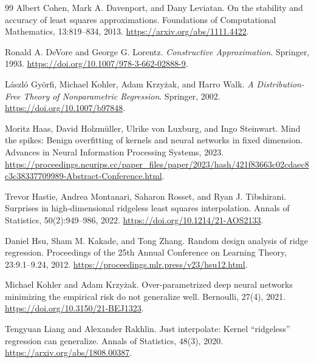 \documentclass[11pt,twoside]{article}
\theoremstyle{definition}
\theoremstyle{remark}
\begin{document}
\begin{thebibliography}{99}
Albert Cohen, Mark A. Davenport, and Dany Leviatan.
\newblock On the stability and accuracy of least squares approximations.
\newblock Foundations of Computational Mathematics, 13:819--834, 2013.
\newblock \url{https://arxiv.org/abs/1111.4422}.

Ronald A. DeVore and George G. Lorentz.
\newblock \emph{Constructive Approximation}.
\newblock Springer, 1993.
\newblock \url{https://doi.org/10.1007/978-3-662-02888-9}.

L\'aszl\'o Gy\"orfi, Michael Kohler, Adam Krzy\.zak, and Harro Walk.
\newblock \emph{A Distribution-Free Theory of Nonparametric Regression}.
\newblock Springer, 2002.
\newblock \url{https://doi.org/10.1007/b97848}.

Moritz Haas, David Holzm\"uller, Ulrike von Luxburg, and Ingo Steinwart.
\newblock Mind the spikes: Benign overfitting of kernels and neural networks
in fixed dimension.
\newblock Advances in Neural Information Processing Systems, 2023.
\newblock \url{https://proceedings.neurips.cc/paper_files/paper/2023/hash/421f83663c02cdaec8c3c38337709989-Abstract-Conference.html}.

Trevor Hastie, Andrea Montanari, Saharon Rosset, and Ryan J. Tibshirani.
\newblock Surprises in high-dimensional ridgeless least squares interpolation.
\newblock Annals of Statistics, 50(2):949--986, 2022.
\newblock \url{https://doi.org/10.1214/21-AOS2133}.

Daniel Hsu, Sham M. Kakade, and Tong Zhang.
\newblock Random design analysis of ridge regression.
\newblock Proceedings of the 25th Annual Conference on Learning Theory,
23:9.1--9.24, 2012.
\newblock \url{https://proceedings.mlr.press/v23/hsu12.html}.

Michael Kohler and Adam Krzy\.zak.
\newblock Over-parametrized deep neural networks minimizing the empirical
risk do not generalize well.
\newblock Bernoulli, 27(4), 2021.
\newblock \url{https://doi.org/10.3150/21-BEJ1323}.

Tengyuan Liang and Alexander Rakhlin.
\newblock Just interpolate: Kernel ``ridgeless'' regression can generalize.
\newblock Annals of Statistics, 48(3), 2020.
\newblock \url{https://arxiv.org/abs/1808.00387}.


\end{thebibliography}
\end{document}
